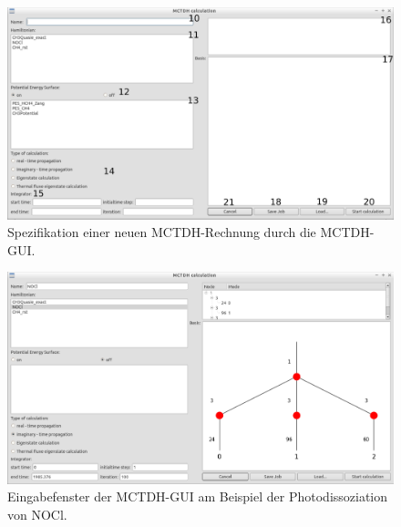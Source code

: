\begin{figure}
    \centering
    \includegraphics[angle=90, scale=0.45]{figures/screenWidgetA}
    \caption{Spezifikation einer neuen MCTDH-Rechnung durch die MCTDH-GUI.}\label{fig:workflow4}
\end{figure}
\begin{figure}
    \centering
    \includegraphics[angle=90, scale=0.45]{figures/screenWidgetAexample}
    \caption{Eingabefenster der MCTDH-GUI am Beispiel der
    Photodissoziation von NOCl.}\label{fig:workflow5}
\end{figure}
